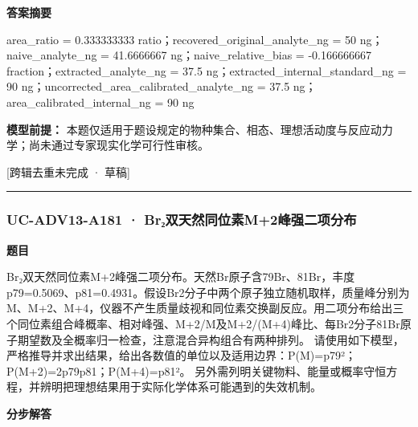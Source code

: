 \documentclass[UTF8,11pt,a4paper]{ctexart}
\begin{document}
\noindent\textbf{答案摘要}\par
area\_ratio = 0.333333333 ratio；recovered\_original\_analyte\_ng = 50 ng；naive\_analyte\_ng = 41.6666667 ng；naive\_relative\_bias = -0.166666667 fraction；extracted\_analyte\_ng = 37.5 ng；extracted\_internal\_standard\_ng = 90 ng；uncorrected\_area\_calibrated\_analyte\_ng = 37.5 ng；area\_calibrated\_internal\_ng = 90 ng\par
\noindent\textbf{模型前提：}
本题仅适用于题设规定的物种集合、相态、理想活动度与反应动力学；尚未通过专家现实化学可行性审核。\par
\noindent\textcolor{red!65!black}{[跨辑去重未完成 · 草稿]} \par
\medskip\hrule\medskip
{}
\subsubsection*{UC-ADV13-A181 · Br₂双天然同位素M+2峰强二项分布}
\noindent\textbf{题目}\par
Br₂双天然同位素M+2峰强二项分布。天然Br原子含79Br、81Br，丰度p79=0.5069、p81=0.4931。假设Br2分子中两个原子独立随机取样，质量峰分别为M、M+2、M+4，仪器不产生质量歧视和同位素交换副反应。用二项分布给出三个同位素组合峰概率、相对峰强、M+2/M及M+2/(M+4)峰比、每Br2分子81Br原子期望数及全概率归一检查，注意混合异构组合有两种排列。 请使用如下模型，严格推导并求出结果，给出各数值的单位以及适用边界：P(M)=p79²；P(M+2)=2p79p81；P(M+4)=p81²。 另外需列明关键物料、能量或概率守恒方程，并辨明把理想结果用于实际化学体系可能遇到的失效机制。\par
\medskip\noindent\textbf{分步解答}
\end{document}
